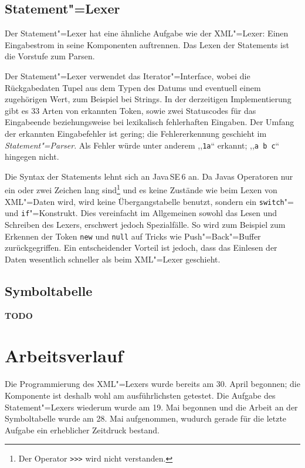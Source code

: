 \documentclass[10pt,a4paper,ngerman,titlepage,tocindentauto]{scrartcl}
\newcommand{\TODO}{ {\LARGE\bf\color{crimson} TODO} }
\begin{document}
		\subsection{Statement"=Lexer}
			Der Statement"=Lexer hat eine ähnliche Aufgabe wie der XML"=Lexer: Einen Eingabestrom in seine
			Komponenten auftrennen. Das Lexen der Statements ist die Vorstufe zum Parsen.
			
			Der Statement"=Lexer verwendet das Iterator"=Interface, wobei die Rückgabedaten
			Tupel aus dem Typen des Datums und eventuell einem zugehörigen Wert, zum Beispiel bei Strings.
			In der derzeitigen Implementierung gibt es 33 Arten von erkannten Token, sowie zwei
			Statuscodes für das Eingabeende beziehungsweise bei lexikalisch fehlerhaften Eingaben.
			Der Umfang der erkannten Eingabefehler ist gering; die Fehlererkennung geschieht im
			{\em Statement"=Parser}. Als Fehler würde unter anderem ,,\verb|1a|`` erkannt; ,,\verb|a b c|`` hingegen nicht.
			
			Die Syntax der Statements lehnt sich an Java\,SE\,6 an. Da Javas Operatoren nur ein oder
			zwei Zeichen lang sind\footnote{Der Operator \texttt{{>}>{>}} wird nicht verstanden.} und es keine Zustände wie beim
			Lexen von XML"=Daten wird, wird keine Übergangstabelle benutzt, sondern ein \verb|switch|"= und
			\verb|if|"=Konstrukt. Dies vereinfacht im Allgemeinen sowohl das Lesen und Schreiben des Lexers,
			erschwert jedoch Spezialfälle. So wird zum Beispiel zum Erkennen der Token \verb|new| und
			\verb|null| auf Tricks wie Push"=Back"=Buffer zurückgegriffen.
			Ein entscheidender Vorteil ist jedoch, dass das Einlesen der Daten wesentlich schneller
			als beim XML"=Lexer geschieht.
	
		\subsection{Symboltabelle}
			\TODO
	
	\section[Arbeitsverlauf]{\hypertarget{Arbeitsverlauf}{Arbeitsverlauf}}
		Die Programmierung des XML"=Lexers wurde bereits am 30. April begonnen; die Komponente ist deshalb
		wohl am ausführlichsten getestet. Die Aufgabe des Statement"=Lexers wiederum wurde
		am 19. Mai begonnen und die Arbeit an der Symboltabelle wurde am 28. Mai aufgenommen,
		wudurch gerade für die letzte Aufgabe ein erheblicher Zeitdruck bestand.
	
\end{document}
